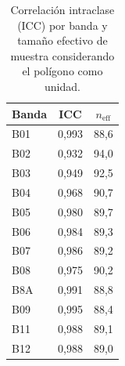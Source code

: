 \begin{table}[htbp]
 \centering
 \small
 \caption{Correlación intraclase (ICC) por banda y tamaño efectivo de muestra considerando el polígono como unidad.}
 \label{tab:icc}
 \begin{tabular}{lcc}
  \toprule
  Banda & ICC & $n_{\mathrm{eff}}$ \\
  \midrule
  B01 & 0{,}993 & 88{,}6 \\
  B02 & 0{,}932 & 94{,}0 \\
  B03 & 0{,}949 & 92{,}5 \\
  B04 & 0{,}968 & 90{,}7 \\
  B05 & 0{,}980 & 89{,}7 \\
  B06 & 0{,}984 & 89{,}3 \\
  B07 & 0{,}986 & 89{,}2 \\
  B08 & 0{,}975 & 90{,}2 \\
  B8A & 0{,}991 & 88{,}8 \\
  B09 & 0{,}995 & 88{,}4 \\
  B11 & 0{,}988 & 89{,}1 \\
  B12 & 0{,}988 & 89{,}0 \\
  \bottomrule
 \end{tabular}
\end{table}

